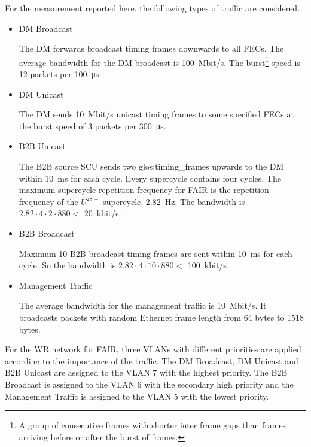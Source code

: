 
 
For the measurement reported here, the following types of traffic are considered.

\begin{itemize}
    \item DM Broadcast 

The DM forwards broadcast timing frames downwards to all FECs. The average bandwidth for the DM broadcast is \SI{100}{Mbit/s}. The burst\footnote{A group of consecutive frames with shorter inter frame gaps than frames arriving before or after the burst of frames.} speed is 12 packets per \SI{100}{\micro\second}.
 		\item DM Unicast 

The DM sends \SI{10}{Mbit/s} unicast timing frames to some specified FECs at the burst speed of 3 packets per \SI{300}{\micro\second}.
	\item B2B Unicast

The B2B source SCU sends two \gls{glos:timing_frame}s upwards to the DM within \SI{10}{\ms} for each cycle. Every supercycle contains four cycles. The maximum supercycle repetition frequency for FAIR is the repetition frequency of the $U^{28+}$ supercycle, \SI{2.82}{\Hz}. The bandwidth is $2.82\cdot4\cdot2\cdot880<$ \SI{20}{kbit/s}. 
	\item B2B Broadcast

Maximum 10 B2B broadcast timing frames are sent within \SI{10}{\ms} for each cycle. So the bandwidth is $2.82\cdot4\cdot10\cdot880<$ \SI{100}{kbit/s}.

	\item Management Traffic

The average bandwidth for the management traffic is \SI{10}{Mbit/s}. It broadcasts packets with random Ethernet frame length from 64 bytes to 1518 bytes. 
\end{itemize}

For the WR network for FAIR, three VLANs with different priorities are applied according to the importance of the traffic. The DM Broadcast, DM Unicast and B2B Unicast are assigned to the VLAN 7 with the highest priority. The B2B Broadcast is assigned to the VLAN 6 with the secondary high priority and the Management Traffic is assigned to the VLAN 5 with the lowest priority.

